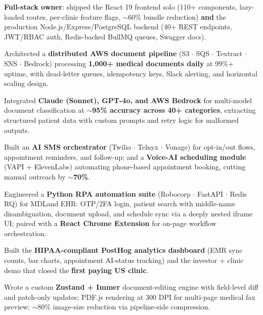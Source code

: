 \documentclass[a4paper,10pt]{article}
\begin{document}
\vspace{2pt}
\begin{itemize}[leftmargin=0.15in, itemsep=1pt]
    \small{\item
    \textbf{Full-stack owner}: shipped the React 19 frontend solo (110+ components, lazy-loaded routes, per-clinic feature flags, $\sim$60\% bundle reduction) \textbf{and} the production Node.js/Express/PostgreSQL backend (40+ REST endpoints, JWT/RBAC auth, Redis-backed BullMQ queues, Swagger docs).
    }

    \small{\item
    Architected a \textbf{distributed AWS document pipeline} (S3 $\cdot$ SQS $\cdot$ Textract $\cdot$ SNS $\cdot$ Bedrock) processing \textbf{1,000+ medical documents daily} at 99\%+ uptime, with dead-letter queues, idempotency keys, Slack alerting, and horizontal scaling design.
    }

    \small{\item
    Integrated \textbf{Claude (Sonnet), GPT-4o, and AWS Bedrock} for multi-model document classification at \textbf{$\sim$95\% accuracy across 40+ categories}, extracting structured patient data with custom prompts and retry logic for malformed outputs.
    }

    \small{\item
    Built an \textbf{AI SMS orchestrator} (Twilio $\cdot$ Telnyx $\cdot$ Vonage) for opt-in/out flows, appointment reminders, and follow-up; and a \textbf{Voice-AI scheduling module} (VAPI + ElevenLabs) automating phone-based appointment booking, cutting manual outreach by $\sim$\textbf{70\%}.
    }

    \small{\item
    Engineered a \textbf{Python RPA automation suite} (Robocorp $\cdot$ FastAPI $\cdot$ Redis RQ) for MDLand EHR: OTP/2FA login, patient search with middle-name disambiguation, document upload, and schedule sync via a deeply nested iframe UI; paired with a \textbf{React Chrome Extension} for on-page workflow orchestration.
    }

    \small{\item
    Built the \textbf{HIPAA-compliant PostHog analytics dashboard} (EMR sync counts, bar charts, appointment AI-status tracking) and the investor + clinic demo that closed the \textbf{first paying US clinic}.
    }

    \small{\item
    Wrote a custom \textbf{Zustand + Immer} document-editing engine with field-level diff and patch-only updates; PDF.js rendering at 300 DPI for multi-page medical fax preview; $\sim$80\% image-size reduction via pipeline-side compression.
    }
\end{itemize}
\end{document}
